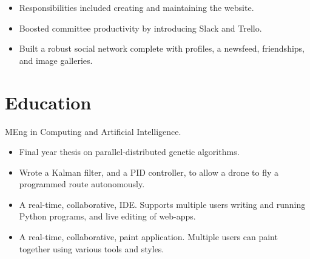 \documentclass{jcgcv}
\begin{document}
\begin{column}
\begin{itemize}
  \item Responsibilities included creating and maintaining the website.
  \item Boosted committee productivity by introducing Slack and Trello.
\end{itemize}

\begin{itemize}
  \item Built a robust social network complete with profiles, a newsfeed, friendships, and image galleries.
\end{itemize}


\section{Education}
MEng in Computing and Artificial Intelligence.

\vspace{2pt}

\begin{adjustwidth}{0.3cm}{}

\begin{itemize}
  \item Final year thesis on parallel-distributed genetic algorithms.
\end{itemize}

\begin{itemize}
  \item Wrote a Kalman filter, and a PID controller, to allow a drone to fly a programmed route autonomously.
\end{itemize}

\begin{itemize}
  \item A real-time, collaborative, IDE. Supports multiple users writing and running Python programs, and live editing of web-apps.
\end{itemize}

\begin{itemize}
  \item A real-time, collaborative, paint application. Multiple users can paint together using various tools and styles.
\end{itemize}


\end{adjustwidth}
\end{column}
\end{document}
